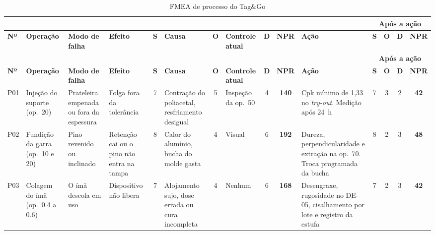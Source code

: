 \begin{landscape}
\begingroup
\scriptsize
\setlength{\tabcolsep}{3pt}
\renewcommand{\arraystretch}{1.2}
\begin{longtable}{@{}
    >{\RaggedRight\arraybackslash}p{0.6cm}
    >{\RaggedRight\arraybackslash}p{2.0cm}
    >{\RaggedRight\arraybackslash}p{2.6cm}
    >{\RaggedRight\arraybackslash}p{2.4cm}
    c
    >{\RaggedRight\arraybackslash}p{3.0cm}
    c
    >{\RaggedRight\arraybackslash}p{2.6cm}
    c c
    >{\RaggedRight\arraybackslash}p{4.6cm}
    c c c c@{}}
    \caption{FMEA de processo do Tag\&Go}\label{tab:fmea_processo}\\
    \toprule
    & & & & & & & & & & & \multicolumn{4}{c}{\textbf{Após a ação}} \\
    \cmidrule(l){12-15}
    \textbf{Nº} & \textbf{Operação} & \textbf{Modo de falha} & \textbf{Efeito} & \textbf{S} & \textbf{Causa} & \textbf{O} & \textbf{Controle atual} & \textbf{D} & \textbf{NPR} & \textbf{Ação} & \textbf{S} & \textbf{O} & \textbf{D} & \textbf{NPR} \\
    \midrule
    \endfirsthead
    \toprule
    & & & & & & & & & & & \multicolumn{4}{c}{\textbf{Após a ação}} \\
    \cmidrule(l){12-15}
    \textbf{Nº} & \textbf{Operação} & \textbf{Modo de falha} & \textbf{Efeito} & \textbf{S} & \textbf{Causa} & \textbf{O} & \textbf{Controle atual} & \textbf{D} & \textbf{NPR} & \textbf{Ação} & \textbf{S} & \textbf{O} & \textbf{D} & \textbf{NPR} \\
    \midrule
    \endhead
    \bottomrule
    \endfoot
    P01 & Injeção do suporte (op.~20) & Prateleira empenada ou fora da espessura & Folga fora da tolerância & 7 & Contração do poliacetal, resfriamento desigual & 5 & Inspeção da op.~50 & 4 & \textbf{140} & Cpk mínimo de 1,33 no \textit{try-out}. Medição após 24~h & 7 & 3 & 2 & \textbf{42} \\
    \addlinespace
    P02 & Fundição da garra (op.~10 e 20) & Pino revenido ou inclinado & Retenção cai ou o pino não entra na tampa & 8 & Calor do alumínio, bucha do molde gasta & 4 & Visual & 6 & \textbf{192} & Dureza, perpendicularidade e extração na op.~70. Troca programada da bucha & 8 & 2 & 3 & \textbf{48} \\
    \addlinespace
    P03 & Colagem do ímã (op.~0.4 a 0.6) & O ímã descola em uso & Dispositivo não libera & 7 & Alojamento sujo, dose errada ou cura incompleta & 4 & Nenhum & 6 & \textbf{168} & Desengraxe, rugosidade no DE-05, cisalhamento por lote e registro da estufa & 7 & 2 & 3 & \textbf{42} \\

\end{longtable}
\end{landscape}
